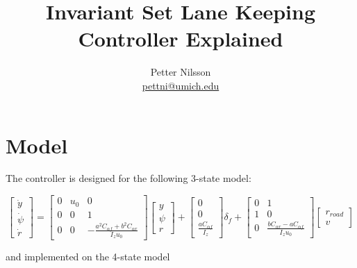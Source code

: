 \documentclass[letterpaper, 12pt]{article}
\title{Invariant Set Lane Keeping Controller Explained}
\author{Petter Nilsson \\ \href{mailto:pettni@umich.edu}{pettni@umich.edu}}
\begin{document}
\section{Model} %
\label{sec:model}

The controller is designed for the following 3-state model:

\begin{equation}
	\begin{bmatrix}
		\dot y \\
		\dot \psi \\
		\dot r
	\end{bmatrix}
	= 
	\begin{bmatrix}
		0 & u_0 & 0 \\
		0 & 0   & 1 \\
		0 & 0 & - \frac{a^2 C_{\alpha f} + b^2 C_{\alpha r}}{I_z u_0}
	\end{bmatrix} 
	\begin{bmatrix}
		y \\
		\psi \\
		r
	\end{bmatrix}
	+ 
	\begin{bmatrix}
		0 \\ 0 \\ \frac{a C_{\alpha f}}{I_z}
	\end{bmatrix}
	\delta_f
	+ \begin{bmatrix}
		0 & 1 \\
		1 & 0 \\
		0 & \frac{b C_{\alpha r} - a C_{\alpha f}}{I_z u_0}
	\end{bmatrix} 
	\begin{bmatrix}
		r_{road} \\
		v
	\end{bmatrix}
\end{equation}

and implemented on the 4-state model
\end{document}
